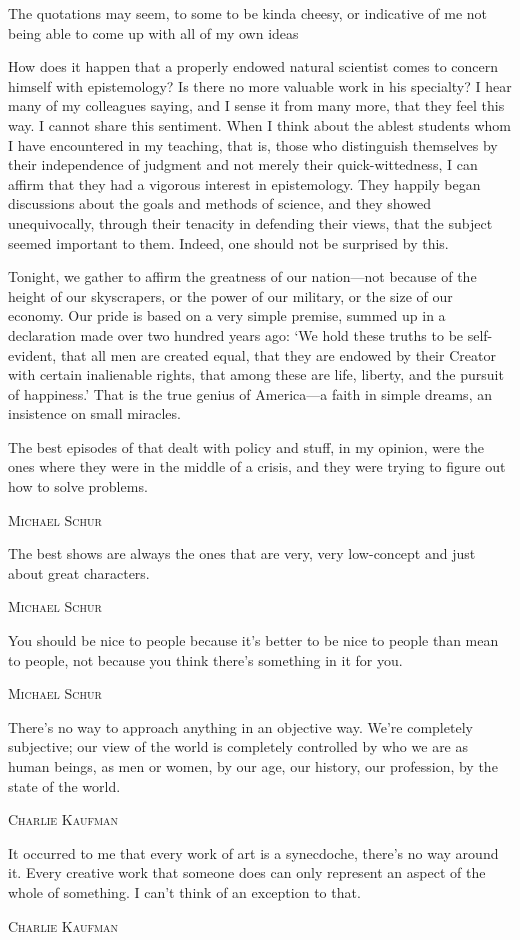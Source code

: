 \documentclass[../butidigress.tex]{subfiles}
\begin{document}
The quotations may seem, to some to be kinda cheesy, or indicative of me not being able to come up with all of my own ideas
\par
\postepi
\epigraph{How does it happen that a properly endowed natural scientist comes to concern himself with epistemology? Is there no more valuable work in his specialty? I hear many of my colleagues saying, and I sense it from many more, that they feel this way. I cannot share this sentiment. When I think about the ablest students whom I have encountered in my teaching, that is, those who distinguish themselves by their independence of judgment and not merely their quick-wittedness, I can affirm that they had a vigorous interest in epistemology. They happily began discussions about the goals and methods of science, and they showed unequivocally, through their tenacity in defending their views, that the subject seemed important to them. Indeed, one should not be surprised by this.}{}
\postepi
\epigraph{Tonight, we gather to affirm the greatness of our nation---not because of the height of our skyscrapers, or the power of our military, or the size of our economy. Our pride is based on a very simple premise, summed up in a declaration made over two hundred years ago: `We hold these truths to be self-evident, that all men are created equal, that they are endowed by their Creator with certain inalienable rights, that among these are life, liberty, and the pursuit of happiness.' That is the true genius of America---a faith in simple dreams, an insistence on small miracles.}{}
\postepi
\epigraph{The best episodes of  that dealt with policy and stuff, in my opinion, were the ones where they were in the middle of a crisis, and they were trying to figure out how to solve problems.}{\scshape Michael Schur}
\postepi
\epigraph{The best shows are always the ones that are very, very low-concept and just about great characters.}{\scshape Michael Schur}
\postepi
\epigraph{You should be nice to people because it's better to be nice to people than mean to people, not because you think there's something in it for you.}{\scshape Michael Schur}
\postepi
\epigraph{There's no way to approach anything in an objective way. We're completely subjective; our view of the world is completely controlled by who we are as human beings, as men or women, by our age, our history, our profession, by the state of the world.}{\scshape Charlie Kaufman}
\postepi
\epigraph{It occurred to me that every work of art is a synecdoche, there's no way around it. Every creative work that someone does can only represent an aspect of the whole of something. I can't think of an exception to that.}{\scshape Charlie Kaufman}
\end{document}
